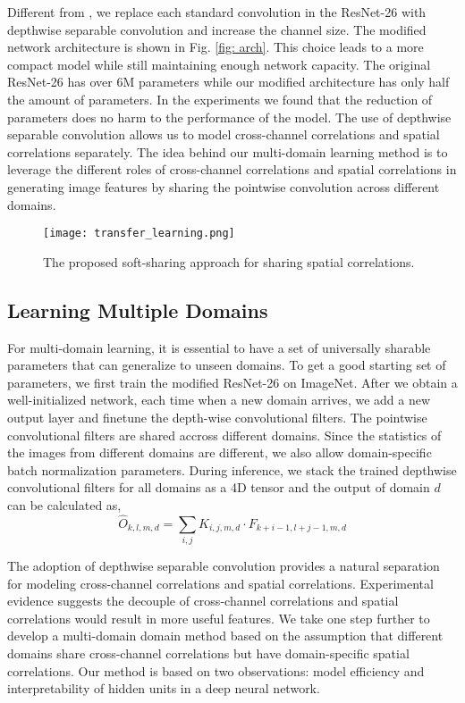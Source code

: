 \documentclass[letterpaper]{article} \usepackage{aaai19}  \usepackage{times}  \usepackage{helvet}  \usepackage{courier}  \usepackage{url}  \usepackage{graphicx}  \usepackage{amssymb}
\begin{document}
Different from \cite{rebuffi18efficient}, we replace each standard convolution in the ResNet-26 with depthwise separable convolution and increase the channel size. The modified network architecture is shown in Fig. \ref{fig: arch}. This choice leads to a more compact model while still maintaining enough network capacity. The original ResNet-26 has over 6M parameters while our modified architecture has only half the amount of parameters. In the experiments we found that the reduction of parameters does no harm to the performance of the model. The use of depthwise separable convolution allows us to model cross-channel correlations and spatial correlations separately. The idea behind our multi-domain learning method is to leverage the different roles of cross-channel correlations and spatial correlations in generating image features by sharing the pointwise convolution across different domains. 

\begin{figure*}[t]
\centering
\texttt{[image: transfer\_learning.png]}
\caption{The proposed soft-sharing approach for sharing spatial correlations.}
\label{fig: transfer}
\end{figure*}
\subsection{Learning Multiple Domains}
For multi-domain learning, it is essential to have a set of universally sharable parameters that can generalize to unseen domains. To get a good starting set of parameters, we first train the modified ResNet-26 on ImageNet. After we obtain a well-initialized network, each time when a new domain arrives, we add a new output layer and finetune the depth-wise convolutional filters. The pointwise convolutional filters are shared accross different domains. Since the statistics of the images from different domains are different, we also allow domain-specific batch normalization parameters. During inference, we stack the trained depthwise convolutional filters for all domains as a 4D tensor and the output of domain $d$ can be calculated as,
\begin{equation}
    \hat{O}_{k,l,m, d} = \sum_{i,j}\hat{K}_{i,j,m, d} \cdot F_{k+i-1, l+j-1,m,d}
\end{equation}

The adoption of depthwise separable convolution provides a natural separation for modeling cross-channel correlations and spatial correlations. Experimental evidence \cite{chollet2017xception} suggests the decouple of cross-channel correlations and spatial correlations would result in more useful features. We take one step further to develop a multi-domain domain method based on the assumption that different domains share cross-channel correlations but have domain-specific spatial correlations. Our method is based on two observations: model efficiency and interpretability of hidden units in a deep neural network.  \\
\end{document}
